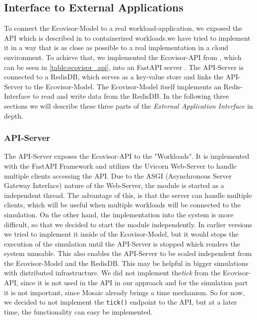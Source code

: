 \subsection{Interface to External Applications}


To connect the Ecovisor-Model to a real workload-application, we exposed the API which is described in \cite{souza2023} to containerized workloads.we have tried to implement it in a way that is as close as possible to a real implementation in a cloud environment.
To achieve that, we implemented the Ecovisor-API from \cite{souza2023}, which can be seen in \ref{table:ecovisor_api}, into an FastAPI server \cite{fastapi}.
The API-Server is connected to a RedisDB\cite{redis}, which serves as a key-value store and links the API-Server to the Ecovisor-Model.
The Ecovisor-Model itself implements an Redis-Interface to read and write data from the RedisDB.
In the following three sections we will describe these three parts of the \textit{External Application Interface} in depth.


\subsubsection{API-Server}
The API-Server exposes the Ecovisor-API to the "Workloads". It is implemented with the FastAPI Framework and utilizes the Uvicorn Web-Server \cite{uvicorn} to handle multiple clients accessing the API. Due to the ASGI (Asynchronous Server Gateway Interface) nature of the Web-Server, the module is started as a independent thread. The advantage of this, is that the server can handle multiple clients, which will be useful when multiple workloads will be connected to the simulation. On the other hand, the implementation into the system is more difficult, so that we decided to start the module independently. In earlier versions we tried to implement it inside of the Ecovisor-Model, but it would stops the execution of the simulation until the API-Server is stopped which renders the system unusable. This also enables the API-Server to be scaled independent from the Ecovisor-Model and the RedisDB. This may be helpful in bigger simulations with distributed infrastructure.
We did not implement the\textit{tick} from the Ecovisor-API, since it is not used in the API in our approach and for the simulation part it is not important, since Mosaic already brings a time mechanism. So for now, we decided to not implement the \texttt{tick()} endpoint to the API, but at a later time, the functionality can easy be implemented.

